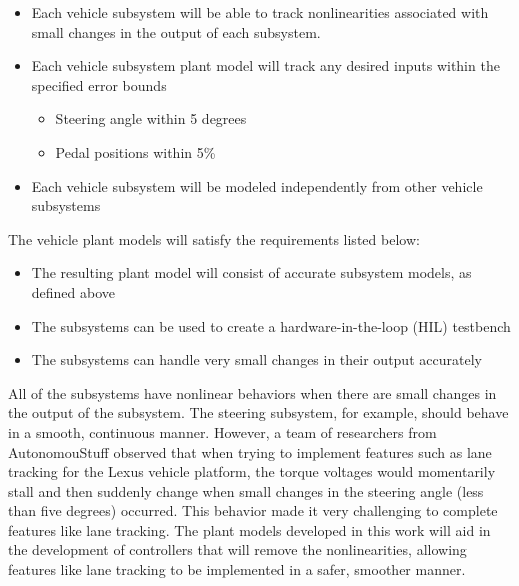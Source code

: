 \documentclass[conference]{IEEEtran}
\begin{document}
\begin{itemize}
  \item Each vehicle subsystem will be able to track nonlinearities %
        associated with small changes in the output of each subsystem. %

\item Each vehicle subsystem plant model will track any desired inputs within the specified error bounds\add{:}
	\begin{itemize}
		\item Steering angle within 5 degrees
		\item Pedal positions within 5\%
	\end{itemize}
\item Each vehicle subsystem will be modeled independently from other vehicle subsystems
\end{itemize}
%
The vehicle plant models will satisfy the requirements listed below:
\begin{itemize}
    \item The resulting plant model will consist of accurate subsystem models, as defined above
    \item The subsystems can be used to create a hardware-in-the-loop (HIL) testbench
    \item The subsystems can handle very small changes in their output accurately
\end{itemize}
%

All of the subsystems have nonlinear behaviors when there are small changes in the output of the subsystem. The steering subsystem, for example, should behave in a smooth, continuous manner. However, a team of researchers from AutonomouStuff observed that when trying to implement features such as lane tracking for the Lexus vehicle platform,  the torque voltages would momentarily stall and then suddenly change when small changes in the steering angle (less than five degrees) occurred. This behavior %
made it very challenging to complete features like lane tracking. The plant models developed in this work will aid in the development of controllers that will remove the nonlinearities, allowing features like lane tracking to be implemented in a safer, smoother manner.
\end{document}
